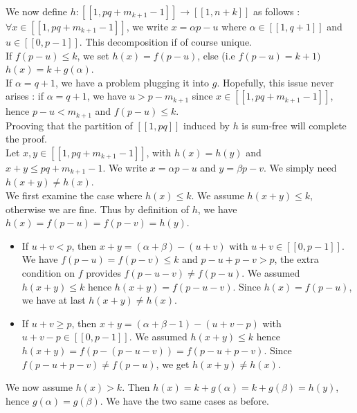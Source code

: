 We now define \(h : [\![1,pq+m_{k+1}-1]\!] \longrightarrow [\![1,n+k]\!] \) as follows :
\( \forall x \in [\![1,pq + m_{k+1}-1]\!] \), we write \(x = \alpha p - u\) where \(\alpha \in [\![1,q+1]\!] \) and \( u \in
[\![0,p-1]\!] \).
This decomposition if of course unique. \\

If \(f(p-u) \leqslant k\), we set \(h(x) = f(p-u)\), else (i.e \(f(p-u) = k + 1)\) \(h(x) = k + g(\alpha) \). \\
If \(\alpha = q+1\), we have a problem plugging it into \(g\). Hopefully, this issue never arises : if 
\(\alpha = q+1\), we have \(u > p - m_{k+1}\) since \(x \in [\![1,pq + m_{k+1}-1]\!]\), hence \(p-u < m_{k+1}\) and \(f(p-u) \leqslant k\). \\

Prooving that the partition of \([\![1,pq]\!]\) induced by \(h\) is sum-free will complete the proof.\\

Let \(x,y \in [\![1,pq + m_{k+1}-1]\!]\), with \(h(x) = h(y)\) and \(x+y \leqslant pq+m_{k+1}-1\). We write \(x = \alpha p - u\) and \(y =
\beta p - v\). We simply need \(h(x+y) \neq h(x)\). \\

We first examine the case where \(h(x) \leqslant k\). We assume \(h(x+y) \leqslant k\), otherwise we are fine. 
Thus by definition of \(h\), we have \(h(x) = f(p-u) = f(p-v) = h(y)\).
\begin{itemize}
\item If \(u+v < p\), then \(x+y = (\alpha+\beta) - (u+v) \) with \(u+v \in [\![0,p-1]\!] \).
We have \(f(p-u) = f(p-v) \leqslant k\) and \(p-u + p-v > p\), the extra condition on \(f\) provides \(f(p-u-v) \neq
f(p-u)\).
We assumed \(h(x+y) \leqslant k\) hence \(h(x+y) = f(p-u-v)\). Since \(h(x) = f(p-u)\), we have at last \(h(x+y) \neq
h(x)\).
\item If \(u+v \geqslant p\), then \(x+y = (\alpha+\beta-1) - (u+v-p) \) with \(u+v-p \in [\![0,p-1]\!] \).
We assumed \(h(x+y) \leqslant k \) hence \(h(x+y) = f( p- (p-u-v)) = f(p-u + p-v)\). Since \(f(p-u+p-v) \neq f(p-u)\),
we get \(h(x+y) \neq h(x)\).
\end{itemize} 
  
We now assume \(h(x) > k\). Then \(h(x) = k + g(\alpha) = k + g(\beta) = h(y)\), hence \(g(\alpha) = g(\beta)\). 
We have the two same cases as before.

